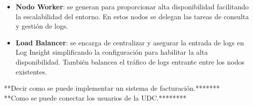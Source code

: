 \begin{itemize}
\begin{itemize}
        \item \textbf{Nodo Worker}: se generan para proporcionar alta disponibilidad facilitando la escalabilidad del entorno. En estos nodos se delegan las tareas de consulta y gestión de logs.
        \item \textbf{Load Balancer}: se encarga de centralizar y asegurar la entrada de logs en Log Insight simplificando la configuración para habilitar la alta disponibilidad. También balancea el tráfico de logs entrante entre los nodos existentes.
    \end{itemize}
\end{itemize}

**Decir como se puede implementar un sistema de facturación.*******\\
**Como se puede conectar los usuarios de la UDC.********

